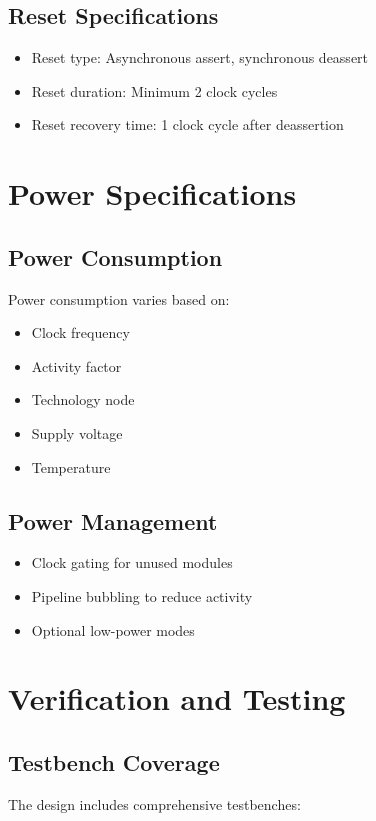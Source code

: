 \documentclass[11pt,a4paper]{article}
\begin{document}
\subsection{Reset Specifications}
\begin{itemize}
    \item Reset type: Asynchronous assert, synchronous deassert
    \item Reset duration: Minimum 2 clock cycles
    \item Reset recovery time: 1 clock cycle after deassertion
\end{itemize}

\section{Power Specifications}

\subsection{Power Consumption}
Power consumption varies based on:
\begin{itemize}
    \item Clock frequency
    \item Activity factor
    \item Technology node
    \item Supply voltage
    \item Temperature
\end{itemize}

\subsection{Power Management}
\begin{itemize}
    \item Clock gating for unused modules
    \item Pipeline bubbling to reduce activity
    \item Optional low-power modes
\end{itemize}

\section{Verification and Testing}

\subsection{Testbench Coverage}
The design includes comprehensive testbenches:
\end{document}
